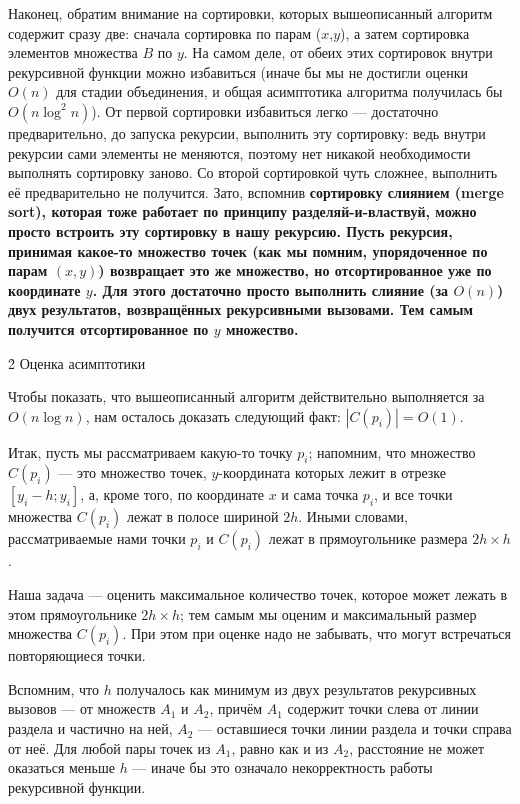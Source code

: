 Наконец, обратим внимание на сортировки, которых вышеописанный алгоритм содержит сразу две: сначала сортировка по парам ($x$,$y$), а затем сортировка элементов множества $B$ по $y$. На самом деле, от обеих этих сортировок внутри рекурсивной функции можно избавиться (иначе бы мы не достигли оценки $O(n)$ для стадии объединения, и общая асимптотика алгоритма получилась бы $O(n \log^2 n)$). От первой сортировки избавиться легко --- достаточно предварительно, до запуска рекурсии, выполнить эту сортировку: ведь внутри рекурсии сами элементы не меняются, поэтому нет никакой необходимости выполнять сортировку заново. Со второй сортировкой чуть сложнее, выполнить её предварительно не получится. Зато, вспомнив \bf{сортировку слиянием} (merge sort), которая тоже работает по принципу разделяй-и-властвуй, можно просто встроить эту сортировку в нашу рекурсию. Пусть рекурсия, принимая какое-то множество точек (как мы помним, упорядоченное по парам $(x,y)$) возвращает это же множество, но отсортированное уже по координате $y$. Для этого достаточно просто выполнить слияние (за $O(n)$) двух результатов, возвращённых рекурсивными вызовами. Тем самым получится отсортированное по $y$ множество.


\h2{ Оценка асимптотики }

Чтобы показать, что вышеописанный алгоритм действительно выполняется за $O(n \log n)$, нам осталось доказать следующий факт: $|C(p_i)| = O(1)$.

Итак, пусть мы рассматриваем какую-то точку $p_i$; напомним, что множество $C(p_i)$ --- это множество точек, $y$-координата которых лежит в отрезке $[y_i-h; y_i]$, а, кроме того, по координате $x$ и сама точка $p_i$, и все точки множества $C(p_i)$ лежат в полосе шириной $2h$. Иными словами, рассматриваемые нами точки $p_i$ и $C(p_i)$ лежат в прямоугольнике размера $2h \times h$.

Наша задача --- оценить максимальное количество точек, которое может лежать в этом прямоугольнике $2h \times h$; тем самым мы оценим и максимальный размер множества $C(p_i)$. При этом при оценке надо не забывать, что могут встречаться повторяющиеся точки.

Вспомним, что $h$ получалось как минимум из двух результатов рекурсивных вызовов --- от множеств $A_1$ и $A_2$, причём $A_1$ содержит точки слева от линии раздела и частично на ней, $A_2$ --- оставшиеся точки линии раздела и точки справа от неё. Для любой пары точек из $A_1$, равно как и из $A_2$, расстояние не может оказаться меньше $h$ --- иначе бы это означало некорректность работы рекурсивной функции.

